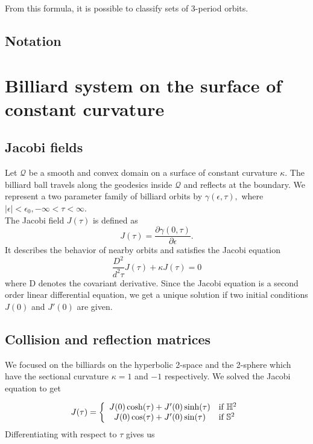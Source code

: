 \documentclass[11pt]{article}
\theoremstyle{plain}
\theoremstyle{definition}
\begin{document}
From this formula, it is possible to classify sets of 3-period orbits.

\subsection{Notation}


\section{Billiard system on the surface of constant curvature}
\subsection{Jacobi fields}
Let $\mathcal{Q}$ be a smooth and convex domain on a surface of constant curvature $\kappa$. The billiard ball travels along the geodesics inside $\mathcal{Q}$ and reflects at the boundary. We represent a two parameter family of billiard orbits by $\gamma(\epsilon, \tau),$  where $|\epsilon| < \epsilon_0, -\infty < \tau < \infty$. \\

The Jacobi field $J(\tau)$ is defined as\\
\[
\displaystyle J(\tau)=\frac{\partial \gamma(0, \tau)}{\partial \epsilon}.
\]
It describes the behavior of nearby orbits and satisfies the Jacobi equation
\[\displaystyle \frac{D^2}{d^2\tau}J(\tau)+ \kappa J(\tau) =0\]
where D denotes the covariant derivative. Since the Jacobi equation is a second order linear differential equation, we get a unique solution if two initial conditions $J(0)$ and  $J'(0)$  are given. \\

\subsection{Collision and reflection matrices}

We focused on the billiards on the hyperbolic 2-space and the 2-sphere which have the sectional curvature $\kappa =1$ and $-1$ respectively.  We solved the Jacobi equation to get

\[
J(\tau)=\left\{ \begin{array}{cl}
J(0) \cosh(\tau)+J'(0) \sinh(\tau)& $if $\mathbb{H}^2 \\
J(0)\cos(\tau) + J'(0)\sin(\tau)& $if $\mathbb{S}^2\\
 \end{array} \right.
\]
Differentiating with respect to $\tau$ gives us
\end{document}
